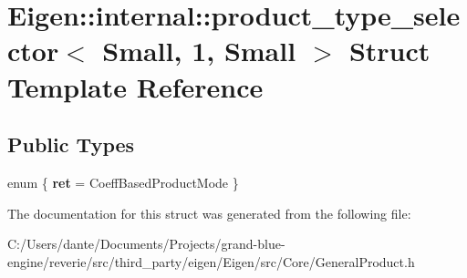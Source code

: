 \hypertarget{struct_eigen_1_1internal_1_1product__type__selector_3_01_small_00_011_00_01_small_01_4}{}\section{Eigen\+::internal\+::product\+\_\+type\+\_\+selector$<$ Small, 1, Small $>$ Struct Template Reference}
\label{struct_eigen_1_1internal_1_1product__type__selector_3_01_small_00_011_00_01_small_01_4}
\subsection*{Public Types}
\begin{DoxyCompactItemize}
\item 
\mbox{\label{struct_eigen_1_1internal_1_1product__type__selector_3_01_small_00_011_00_01_small_01_4_a3a65c55c56fbdb959a531ae6e4bb17de}} 
enum \{ {\bfseries ret} = Coeff\+Based\+Product\+Mode
 \}
\end{DoxyCompactItemize}


The documentation for this struct was generated from the following file\+:\begin{DoxyCompactItemize}
\item 
C\+:/\+Users/dante/\+Documents/\+Projects/grand-\/blue-\/engine/reverie/src/third\+\_\+party/eigen/\+Eigen/src/\+Core/General\+Product.\+h\end{DoxyCompactItemize}
